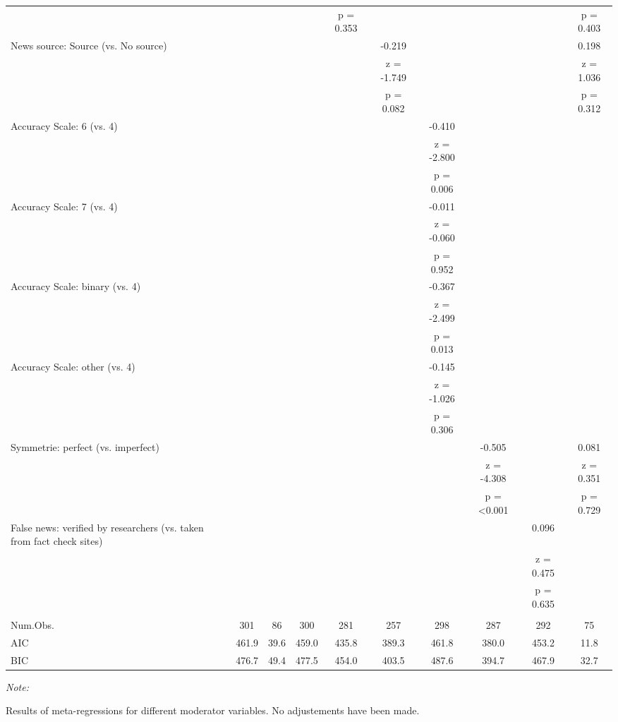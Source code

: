 \documentclass[
  man]{apa6}
\begin{document}
\begin{table}
{\begin{threeparttable}
\begin{tabular}[t]{lccccccccc}
 &  &  &  & p = 0.353 &  &  &  &  & p = 0.403\\
News source: Source (vs. No source) &  &  &  &  & -0.219 &  &  &  & 0.198\\
 &  &  &  &  & z = -1.749 &  &  &  & z = 1.036\\
 &  &  &  &  & p = 0.082 &  &  &  & p = 0.312\\
Accuracy Scale: 6 (vs. 4) &  &  &  &  &  & -0.410 &  &  & \\
 &  &  &  &  &  & z = -2.800 &  &  & \\
 &  &  &  &  &  & p = 0.006 &  &  & \\
Accuracy Scale: 7 (vs. 4) &  &  &  &  &  & -0.011 &  &  & \\
 &  &  &  &  &  & z = -0.060 &  &  & \\
 &  &  &  &  &  & p = 0.952 &  &  & \\
Accuracy Scale: binary (vs. 4) &  &  &  &  &  & -0.367 &  &  & \\
 &  &  &  &  &  & z = -2.499 &  &  & \\
 &  &  &  &  &  & p = 0.013 &  &  & \\
Accuracy Scale: other (vs. 4) &  &  &  &  &  & -0.145 &  &  & \\
 &  &  &  &  &  & z = -1.026 &  &  & \\
 &  &  &  &  &  & p = 0.306 &  &  & \\
Symmetrie: perfect (vs. imperfect) &  &  &  &  &  &  & -0.505 &  & 0.081\\
 &  &  &  &  &  &  & z = -4.308 &  & z = 0.351\\
 &  &  &  &  &  &  & p = <0.001 &  & p = 0.729\\
False news: verified by researchers (vs. taken from fact check sites) &  &  &  &  &  &  &  & 0.096 & \\
 &  &  &  &  &  &  &  & z = 0.475 & \\
 &  &  &  &  &  &  &  & p = 0.635 & \\
\midrule\\
Num.Obs. & 301 & 86 & 300 & 281 & 257 & 298 & 287 & 292 & 75\\
AIC & 461.9 & 39.6 & 459.0 & 435.8 & 389.3 & 461.8 & 380.0 & 453.2 & 11.8\\
BIC & 476.7 & 49.4 & 477.5 & 454.0 & 403.5 & 487.6 & 394.7 & 467.9 & 32.7\\
\bottomrule
\end{tabular}
\begin{tablenotes}
\item \textit{Note: } 
\item Results of meta-regressions for different moderator variables. No adjustements have been made.
\end{tablenotes}
\end{threeparttable}}
\end{table}
\end{document}
